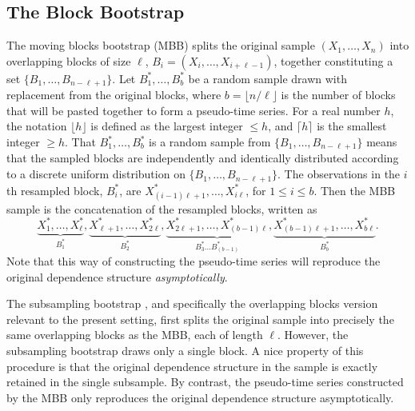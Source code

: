 \documentclass[a4paper, 12pt]{article}
\theoremstyle{plain}
\theoremstyle{definition}
\begin{document}
\subsection{The Block Bootstrap}

The moving blocks bootstrap (MBB) \citep{Kunsch:1989} splits the original sample $(X_{1}, \ldots, X_{n})$ into overlapping blocks of size $\ell$, $B_{i}=(X_{i}, \ldots, X_{i+\ell-1})$, together constituting a set \break$\{B_{1}, \ldots, B_{n-\ell+1}\}$. Let $B_{1}^{*}, \ldots, B_{b}^{*}$ be a random sample drawn with replacement from the original blocks, where $b=\lfloor n/\ell \rfloor$ is the number of blocks that will be pasted together to form a pseudo-time series. For a real number $h$, the notation $\lfloor h \rfloor $ is defined as the largest integer $\leq h$, and $\lceil h \rceil$ is the smallest integer $\geq h$. That $B_{1}^{*}, \ldots, B_{b}^{*}$ is a random sample from $\{B_{1}, \ldots, B_{n-\ell+1}\}$ means that the sampled blocks are independently and identically distributed according to a discrete uniform distribution on $\{B_{1}, \ldots, B_{n-\ell+1}\}$. The observations in the $i$th resampled block, $B_{i}^{*}$, are $X_{(i-1)\ell+1}^{*}, \ldots, X_{i\ell}^{*}$, for $1 \leq i \leq b$. Then the MBB sample is the concatenation of the resampled blocks, written as 
\[
\underbrace{X_{1}^{*}, \ldots, X_{\ell}^{*}}_{B_{1}^{*}}, \underbrace{X_{\ell+1}^{*}, \ldots, X_{2\ell}^{*}}_{B_{2}^{*}}, \underbrace{X_{2\ell+1}^{*}, \ldots, X_{(b-1)\ell}^{*}}_{B_{3}^{*} \ldots B_{(b-1)}^{*}}, \underbrace{X_{(b-1)\ell+1}^{*}, \ldots, X_{b\ell}^{*}}_{B_{b}^{*}}.
\]
Note that this way of constructing the pseudo-time series will reproduce the original dependence structure \textit{asymptotically}.

The subsampling bootstrap \citep{PolitisRomano:1994a}, and specifically the overlapping blocks version relevant to the present setting, first splits the original sample into precisely the same overlapping blocks as the MBB, each of length $\ell$. However, the subsampling bootstrap draws only a single block. A nice property of this procedure is that the original dependence structure in the sample is exactly retained in the single subsample. By contrast, the pseudo-time series constructed by the MBB only reproduces the original dependence structure asymptotically. 
\end{document}
